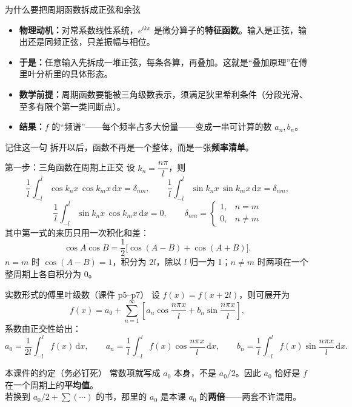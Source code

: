\documentclass[aspectratio=169,10pt]{beamer}
\newcommand{\bstrong}[1]{{\color{deep}\bfseries #1}}
\newcommand{\bhl}[1]{{\color{mid}\bfseries #1}}
\begin{document}
\begin{frame}{为什么要把周期函数拆成正弦和余弦}
  \begin{itemize}\small
    \item \bstrong{物理动机：}对常系数线性系统，$e^{ikx}$ 是微分算子的\bhl{特征函数}。输入是正弦，输出还是同频正弦，只差振幅与相位。
    \item \bstrong{于是：}任意输入先拆成一堆正弦，每条各算，再叠加。这就是“叠加原理”在傅里叶分析里的具体形态。
    \item \bstrong{数学前提：}周期函数要能被三角级数表示，须满足狄里希利条件（分段光滑、至多有限个第一类间断点）。
    \item \bstrong{结果：}$f$ 的“频谱”——每个频率占多大份量——变成一串可计算的数 $a_n,b_n$。
  \end{itemize}
  \vspace{6pt}
  \begin{block}{记住这一句}
    \small 拆开以后，函数不再是一个整体，而是一张\bhl{频率清单}。
  \end{block}
\end{frame}

\begin{frame}{第一步：三角函数在周期上正交}
  设 $k_n=\dfrac{n\pi}{l}$，则
  \[
    \frac{1}{l}\int_{-l}^{l}\cos k_nx\,\cos k_mx\,\mathrm{d}x=\delta_{nm},\qquad
    \frac{1}{l}\int_{-l}^{l}\sin k_nx\,\sin k_mx\,\mathrm{d}x=\delta_{nm},
  \]
  \[
    \frac{1}{l}\int_{-l}^{l}\sin k_nx\,\cos k_mx\,\mathrm{d}x=0,
    \qquad \delta_{nm}=\begin{cases}1,&n=m\\0,&n\neq m\end{cases}
  \]
  \vspace{2pt}
  {\small 其中第一式的来历只用一次积化和差：}
  \[
    \cos A\cos B=\frac{1}{2}\big[\cos(A-B)+\cos(A+B)\big].
  \]
  {\small $n=m$ 时 $\cos(A-B)=1$，积分为 $2l$，除以 $l$ 归一为 1；$n\neq m$ 时两项在一个整周期上各自积分为 0。}
\end{frame}

\begin{frame}{实数形式的傅里叶级数（课件 p5--p7）}
  {\small 设 $f(x)=f(x+2l)$，则可展开为}
  \[
    f(x)=a_0+\sum_{n=1}^{\infty}\left[a_n\cos\frac{n\pi x}{l}+b_n\sin\frac{n\pi x}{l}\right],
  \]
  {\small 系数由正交性给出：}
  \[
    a_0=\frac{1}{2l}\int_{-l}^{l}f(x)\,\mathrm{d}x,\qquad
    a_n=\frac{1}{l}\int_{-l}^{l}f(x)\cos\frac{n\pi x}{l}\,\mathrm{d}x,\qquad
    b_n=\frac{1}{l}\int_{-l}^{l}f(x)\sin\frac{n\pi x}{l}\,\mathrm{d}x.
  \]
  \begin{block}{本课件的约定（务必钉死）}
    \small 常数项就写成 $a_0$ 本身，不是 $a_0/2$。因此 $a_0$ 恰好是 $f$ 在一个周期上的\bhl{平均值}。\\
    若换到 $a_0/2+\sum(\cdots)$ 的书，那里的 $a_0$ 是本课 $a_0$ 的\bhl{两倍}——两套不许混用。
  \end{block}
\end{frame}
\end{document}

